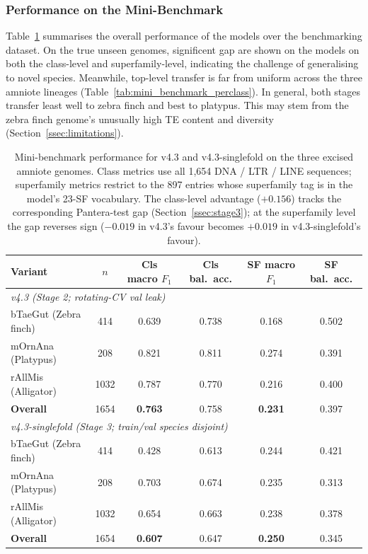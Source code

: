 \documentclass[12pt]{article}
\begin{document}
\subsubsection{Performance on the Mini-Benchmark}

Table~\ref{tab:mini_benchmark} summarises the overall performance of the models over the benchmarking dataset. On the true unseen genomes, significent gap are shown on the models on both the class-level and superfamily-level, indicating the challenge of generalising to novel species. Meanwhile, top-level transfer is far from uniform across the three amniote lineages (Table~\ref{tab:mini_benchmark_perclass}). In general, both stages transfer least well to zebra finch and best to platypus. This may stem from the zebra finch genome's unusually high TE content and diversity (Section~\ref{ssec:limitations}). 

\begin{table}[h]
\centering
\small
\caption{Mini-benchmark performance for v4.3 and v4.3-singlefold on the three excised amniote genomes. Class metrics use all 1{,}654 DNA / LTR / LINE sequences; superfamily metrics restrict to the 897 entries whose superfamily tag is in the model's 23-SF vocabulary. The class-level advantage ($+0.156$) tracks the corresponding Pantera-test gap (Section~\ref{ssec:stage3}); at the superfamily level the gap reverses sign ($-0.019$ in v4.3's favour becomes $+0.019$ in v4.3-singlefold's favour).}
\label{tab:mini_benchmark}
\begin{tabular}{lccccc}
\hline
Variant & $n$ & Cls macro $F_1$ & Cls bal.~acc. & SF macro $F_1$ & SF bal.~acc. \\
\hline
\multicolumn{6}{l}{\textit{v4.3 (Stage 2; rotating-CV val leak)}} \\
\quad bTaeGut (Zebra finch)        &  414 & 0.639 & 0.738 & 0.168 & 0.502 \\
\quad mOrnAna (Platypus)           &  208 & 0.821 & 0.811 & 0.274 & 0.391 \\
\quad rAllMis (Alligator)          & 1032 & 0.787 & 0.770 & 0.216 & 0.400 \\
\quad \textbf{Overall}             & 1654 & \textbf{0.763} & 0.758 & \textbf{0.231} & 0.397 \\
\hline
\multicolumn{6}{l}{\textit{v4.3-singlefold (Stage 3; train/val species disjoint)}} \\
\quad bTaeGut (Zebra finch)        &  414 & 0.428 & 0.613 & 0.244 & 0.421 \\
\quad mOrnAna (Platypus)           &  208 & 0.703 & 0.674 & 0.235 & 0.313 \\
\quad rAllMis (Alligator)          & 1032 & 0.654 & 0.663 & 0.238 & 0.378 \\
\quad \textbf{Overall}             & 1654 & \textbf{0.607} & 0.647 & \textbf{0.250} & 0.345 \\
\hline
\end{tabular}
\end{table}
\end{document}
